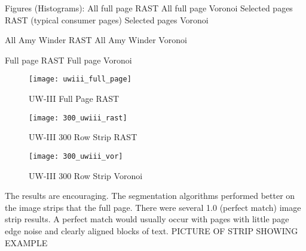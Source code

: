 \documentclass[conference]{IEEEtran}
\begin{document}
Figures (Histograms):
	All full page RAST
	All full page Voronoi
	Selected pages RAST (typical consumer pages)
	Selected pages Voronoi

	All Amy Winder RAST
	All Amy Winder Voronoi

	Full page RAST
	Full page Voronoi

\begin{figure}[uwiii-fullpage-rast]
\texttt{[image: uwiii\_full\_page]}
\caption{UW-III Full Page RAST}
\label{fig:uwiii-fullpage-rast}
\end{figure}

\begin{figure}[300_uwiii-rast]
\texttt{[image: 300\_uwiii\_rast]}
\caption{UW-III 300 Row Strip RAST}
\label{fig:300-uwiii-rast}
\end{figure}

\begin{figure}[300_uwiii-vor]
\texttt{[image: 300\_uwiii\_vor]}
\caption{UW-III 300 Row Strip Voronoi}
\label{fig:300-uwiii-vor}
\end{figure}


The results are encouraging. The segmentation algorithms performed better on
the image strips that the full page. There were several 1.0 (perfect match)
image strip results. A perfect match would usually occur with pages with
little page edge noise and clearly aligned blocks of text.  
PICTURE OF STRIP SHOWING EXAMPLE


%
%
\end{document}
